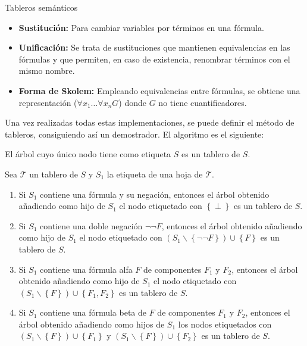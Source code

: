 \documentclass[final]{beamer}
\newlength{\onecolwid}
\newlength{\twocolwid}
\begin{document}
\begin{frame}[t,fragile]
\begin{columns}[t]
\begin{column}{\twocolwid}
\begin{columns}[t,totalwidth=\twocolwid]
\begin{column}{\onecolwid}
\begin{block}{Tableros semánticos}
    \begin{itemize}
    \item \textbf{Sustitución:} Para cambiar variables por términos en una fórmula.
    \item \textbf{Unificación:} Se trata de sustituciones que mantienen equivalencias
      en las fórmulas y que permiten, en caso de existencia, renombrar términos con el
      mismo nombre.
    \item \textbf{Forma de Skolem:} Empleando equivalencias entre fórmulas, se obtiene
      una representación ($\forall x_1 \dots \forall x_n G$) donde $G$ no tiene
      cuantificadores. 
    \end{itemize}
    Una vez realizadas todas estas implementaciones, se puede definir el método de tableros,
    consiguiendo así un demostrador. El algoritmo es el siguiente:

    \begin{itemize*}
\item El árbol cuyo único nodo tiene como etiqueta $S$ es
  un tablero de $S$.
\item Sea $\mathcal{T}$ un tablero de $S$ y $S_1$ la etiqueta de
  una hoja  de $\mathcal{T}$.
  \begin{enumerate}
  \item Si $S_1$ contiene una fórmula y su negación, entonces el árbol
    obtenido añadiendo como hijo de $S_1$ el nodo etiquetado con
    $\left\{ \perp \right\}$ es un tablero de $S$.
  \item Si $S_1$ contiene una doble negación $\neg \neg F$, entonces
    el árbol obtenido añadiendo como hijo de $S_1$ el nodo etiquetado
    con $(S_1 \backslash \left\{\neg \neg F \right\})\cup \left\{ F \right\}$
    es un tablero de $S$.
  \item Si $S_1$ contiene una fórmula alfa $F$ de componentes $F_1$ y $F_2$,
    entonces el árbol obtenido añadiendo como hijo de $S_1$ el nodo etiquetado
    con $(S_1 \backslash \left\{ F \right\})\cup \left\{ F_1,F_2 \right\}$
    es un tablero de $S$.
  \item Si $S_1$ contiene una fórmula beta de $F$ de componentes $F_1$ y $F_2$,
    entonces el árbol obtenido añadiendo como hijos de $S_1$ los nodos
    etiquetados con $(S_1 \backslash \left\{ F \right\}) \cup \left\{ F_1 \right\}$ y
    $(S_1 \backslash \left\{ F \right\})\cup \left\{ F_2 \right\}$ es un tablero
    de $S$.
  \end{enumerate}
\end{itemize*}
    

\end{block}
\end{column}
\end{columns}
\end{column}
\end{columns}
\end{frame}
\end{document}
